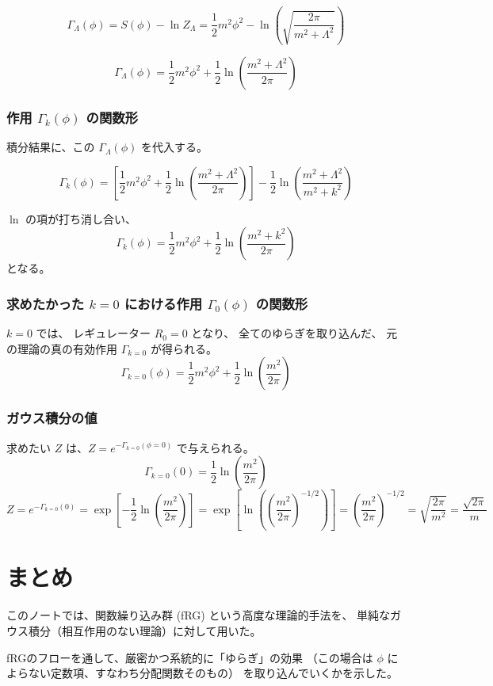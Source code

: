 \documentclass[uplatex,a4j,12pt,dvipdfmx]{jsarticle}
\begin{document}
\[
	\Gamma_\Lambda(\phi) = S(\phi) - \ln Z_\Lambda = \frac{1}{2}m^2 \phi^2 - \ln \left( \sqrt{\frac{2\pi}{m^2+\Lambda^2}} \right)
\]

\[
	\Gamma_\Lambda(\phi) = \frac{1}{2}m^2 \phi^2 + \frac{1}{2} \ln \left( \frac{m^2+\Lambda^2}{2\pi} \right)
\]

\subsubsection{作用 $\Gamma_{k}(\phi)$ の関数形}

積分結果に、この $\Gamma_\Lambda(\phi)$ を代入する。

\[
	\Gamma_k(\phi) = \left[ \frac{1}{2}m^2 \phi^2 + \frac{1}{2} \ln \left( \frac{m^2+\Lambda^2}{2\pi} \right) \right] - \frac{1}{2} \ln \left( \frac{m^{2} + \Lambda^{2}}{m^{2}+k^{2}} \right)
\]

$\ln$ の項が打ち消し合い、
\[
	\Gamma_k(\phi) = \frac{1}{2}m^2 \phi^2 + \frac{1}{2} \ln \left( \frac{m^2+k^2}{2\pi} \right)
\]
となる。
\subsubsection{求めたかった $k=0$ における作用 $\Gamma_{0}(\phi)$ の関数形}

$k=0$ では、
レギュレーター $R_0 = 0$ となり、
全てのゆらぎを取り込んだ、
元の理論の真の有効作用 $\Gamma_{k=0}$ が得られる。
\[
	\Gamma_{k=0}(\phi) = \frac{1}{2}m^2 \phi^2 + \frac{1}{2} \ln \left( \frac{m^2}{2\pi} \right)
\]

\subsubsection{ガウス積分の値}

求めたい $Z$ は、$Z = e^{-\Gamma_{k=0}(\phi=0)}$ で与えられる。
\[
	\Gamma_{k=0}(0) = \frac{1}{2} \ln \left( \frac{m^2}{2\pi} \right)
\]
\[
	Z = e^{-\Gamma_{k=0}(0)} = \exp \left[ -\frac{1}{2} \ln \left( \frac{m^2}{2\pi} \right) \right]
	= \exp \left[ \ln \left( \left(\frac{m^2}{2\pi}\right)^{-1/2} \right) \right]
	= \left( \frac{m^2}{2\pi} \right)^{-1/2}
	= \sqrt{\frac{2\pi}{m^2}}
	= \frac{\sqrt{2\pi}}{m}
\]
\section{まとめ}

このノートでは、関数繰り込み群 (fRG) という高度な理論的手法を、
単純なガウス積分（相互作用のない理論）に対して用いた。

fRGのフローを通して、厳密かつ系統的に「ゆらぎ」の効果
（この場合は $\phi$ によらない定数項、すなわち分配関数そのもの）
を取り込んでいくかを示した。
\end{document}
